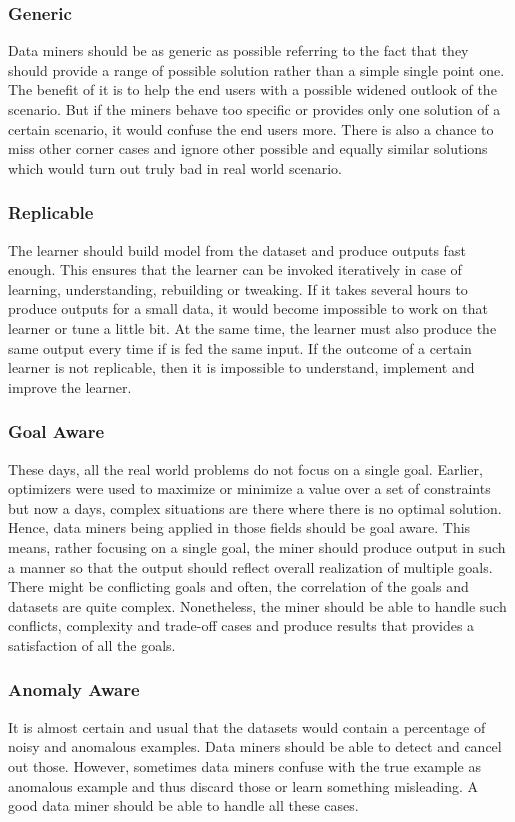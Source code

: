 \documentclass[sigplan]{acmart}\settopmatter{printfolios=true,printccs=false,printacmref=false}
\begin{document}
\subsubsection{Generic}
Data miners should be as generic as possible referring to the fact that they should provide a range of possible solution rather than a simple single point one. The benefit of it is to help the end users with a possible widened outlook of the scenario. But if the miners behave too specific or provides only one solution of a certain scenario, it would confuse the end users more. There is also a chance to miss other corner cases and ignore other possible and equally similar solutions which would turn out truly bad in real world scenario.  

\subsubsection{Replicable}
The learner should build model from the dataset and produce outputs fast enough. This ensures that the learner can be invoked iteratively in case of learning, understanding, rebuilding or tweaking. If it takes several hours to produce outputs for a small data, it would become impossible to work on that learner or tune a little bit. At the same time, the learner must also produce the same output every time if is fed the same input. If the outcome of a certain learner is not replicable, then it is impossible to understand, implement and improve the learner. 

\subsubsection{Goal Aware}
These days, all the real world problems do not focus on a single goal. Earlier, optimizers were used to maximize or minimize a value over a set of constraints but now a days, complex situations are there where there is no optimal solution. Hence, data miners being applied in those fields should be goal aware. This means, rather focusing on a single goal, the miner should produce output in such a manner so that the output should reflect overall realization of multiple goals. There might be conflicting goals and often, the correlation of the goals and datasets are quite complex. Nonetheless, the miner should be able to handle such conflicts, complexity and trade-off cases and produce results that provides a satisfaction of all the goals.  

\subsubsection{Anomaly Aware}
It is almost certain and usual that the datasets would contain a percentage of noisy and anomalous examples. Data miners should be able to detect and cancel out those. However, sometimes data miners confuse with the true example as anomalous example and thus discard those or learn something misleading. A good data miner should be able to handle all these cases.
\end{document}

